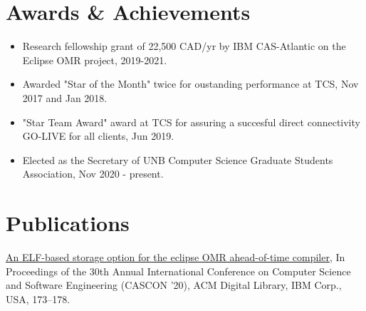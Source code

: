 \documentclass[letterpaper,10pt]{article}
\newcommand{\resumeItem}[1]{
  \item\small{
    {#1 \vspace{-2pt}}
  }
}
\newcommand{\resumeItemListStart}{\begin{itemize}}
\newcommand{\resumeItemListEnd}{\end{itemize}\vspace{-5pt}}
\begin{document}
%
\section{Awards \& Achievements}
 \begin{itemize}[leftmargin=0.15in, label={}]
    \small{\item{
      \resumeItemListStart
       \resumeItem{Research fellowship grant of 22,500 CAD/yr by IBM CAS-Atlantic on the Eclipse OMR project, 2019-2021. } \\
       \resumeItem{Awarded "Star of the Month" twice for oustanding performance at TCS, Nov 2017 and Jan 2018.} \\
       \resumeItem{"Star Team Award" award at TCS for assuring a succesful direct connectivity GO-LIVE for all clients, Jun 2019.} \\
       \resumeItem{Elected as the Secretary of UNB Computer Science Graduate Students Association, Nov 2020 - present.} \\
       \resumeItemListEnd
    }}
 \end{itemize}



%
\section{Publications}
 \begin{itemize}[leftmargin=0.15in, label={}]
    \small{\item{
      \href{https://dl.acm.org/doi/abs/10.5555/3432601.3432624}{\underline{{An ELF-based storage option for the eclipse OMR ahead-of-time compiler,}}}{ In Proceedings of the 30th Annual International Conference on Computer Science and Software Engineering (CASCON '20), ACM Digital Library, IBM Corp., USA, 173–178.} 
     }}
 \end{itemize}


\end{document}
